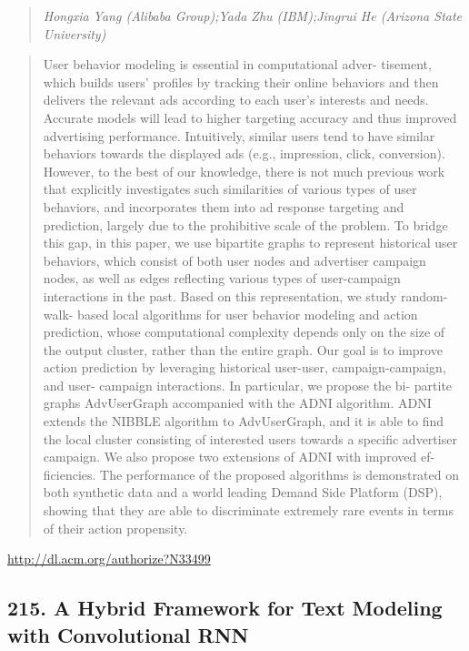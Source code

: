 \documentclass{article}
\begin{document}
\begin{quote}
\footnotesize{\textit{Hongxia Yang (Alibaba Group);Yada Zhu (IBM);Jingrui He (Arizona State University)}}

\end{quote}

\begin{quote}
User behavior modeling is essential in computational adver- tisement, which builds users’ profiles by tracking their online behaviors and then delivers the relevant ads according to each user’s interests and needs. Accurate models will lead to higher targeting accuracy and thus improved advertising performance. Intuitively, similar users tend to have similar behaviors towards the displayed ads (e.g., impression, click, conversion). However, to the best of our knowledge, there is not much previous work that explicitly investigates such similarities of various types of user behaviors, and incorporates them into ad response targeting and prediction, largely due to the prohibitive scale of the problem. To bridge this gap, in this paper, we use bipartite graphs to represent historical user behaviors, which consist of both user nodes and advertiser campaign nodes, as well as edges reflecting various types of user-campaign interactions in the past. Based on this representation, we study random-walk- based local algorithms for user behavior modeling and action prediction, whose computational complexity depends only on the size of the output cluster, rather than the entire graph. Our goal is to improve action prediction by leveraging historical user-user, campaign-campaign, and user- campaign interactions. In particular, we propose the bi- partite graphs AdvUserGraph accompanied with the ADNI algorithm. ADNI extends the NIBBLE algorithm to AdvUserGraph, and it is able to find the local cluster consisting of interested users towards a specific advertiser campaign. We also propose two extensions of ADNI with improved ef- ficiencies. The performance of the proposed algorithms is demonstrated on both synthetic data and a world leading Demand Side Platform (DSP), showing that they are able to discriminate extremely rare events in terms of their action propensity.
\end{quote}

\href{http://dl.acm.org/authorize?N33499}{http://dl.acm.org/authorize?N33499}

\subsection{215. A Hybrid Framework for Text Modeling with Convolutional RNN}
\end{document}
